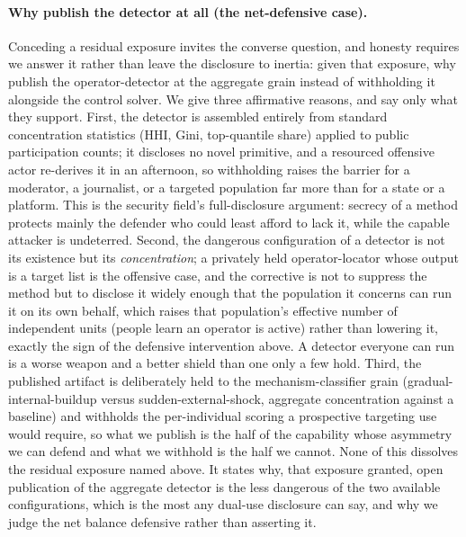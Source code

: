 \documentclass[11pt]{article}
\begin{document}
\paragraph{Why publish the detector at all (the net-defensive case).} Conceding a residual exposure invites the converse question, and honesty requires we answer it rather than leave the disclosure to inertia: given that exposure, why publish the operator-detector at the aggregate grain instead of withholding it alongside the control solver. We give three affirmative reasons, and say only what they support. First, the detector is assembled entirely from standard concentration statistics (HHI, Gini, top-quantile share) applied to public participation counts; it discloses no novel primitive, and a resourced offensive actor re-derives it in an afternoon, so withholding raises the barrier for a moderator, a journalist, or a targeted population far more than for a state or a platform. This is the security field's full-disclosure argument: secrecy of a method protects mainly the defender who could least afford to lack it, while the capable attacker is undeterred. Second, the dangerous configuration of a detector is not its existence but its \emph{concentration}; a privately held operator-locator whose output is a target list is the offensive case, and the corrective is not to suppress the method but to disclose it widely enough that the population it concerns can run it on its own behalf, which raises that population's effective number of independent units (people learn an operator is active) rather than lowering it, exactly the sign of the defensive intervention above. A detector everyone can run is a worse weapon and a better shield than one only a few hold. Third, the published artifact is deliberately held to the mechanism-classifier grain (gradual-internal-buildup versus sudden-external-shock, aggregate concentration against a baseline) and withholds the per-individual scoring a prospective targeting use would require, so what we publish is the half of the capability whose asymmetry we can defend and what we withhold is the half we cannot. None of this dissolves the residual exposure named above. It states why, that exposure granted, open publication of the aggregate detector is the less dangerous of the two available configurations, which is the most any dual-use disclosure can say, and why we judge the net balance defensive rather than asserting it.
\end{document}
